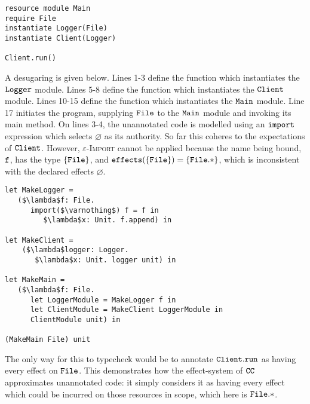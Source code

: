 \begin{lstlisting}
resource module Main
require File
instantiate Logger(File)
instantiate Client(Logger)

Client.run()
\end{lstlisting}

A desugaring is given below. Lines 1-3 define the function which instantiates the $\mathtt{Logger}$ module. Lines 5-8 define the function which instantiates the $\mathtt{Client}$ module. Lines 10-15 define the function which instantiates the $\mathtt{Main}$ module. Line 17 initiates the program, supplying $\mathtt{File}$ to the $\mathtt{Main}$ module and invoking its main method. On lines 3-4, the unannotated code is modelled using an $\mathtt{import}$ expression which selects $\varnothing$ as its authority. So far this coheres to the expectations of $\mathtt{Client}$. However, \textsc{$\varepsilon$-Import} cannot be applied because the name being bound, $\mathtt{f}$, has the type $\{ \mathtt{File} \}$, and $\mathtt{effects}(\{ \mathtt{File} \}) = \{ \mathtt{File}.* \}$, which is inconsistent with the declared effects $\varnothing$.

\begin{lstlisting}
let MakeLogger =
   ($\lambda$f: File.
      import($\varnothing$) f = f in
         $\lambda$x: Unit. f.append) in

let MakeClient =
	($\lambda$logger: Logger.
	   $\lambda$x: Unit. logger unit) in

let MakeMain =
   ($\lambda$f: File.
      let LoggerModule = MakeLogger f in
      let ClientModule = MakeClient LoggerModule in
      ClientModule unit) in

(MakeMain File) unit
\end{lstlisting}

The only way for this to typecheck would be to annotate $\mathtt{Client.run}$ as having every effect on $\mathtt{File}$. This demonstrates how the effect-system of $\mathtt{CC}$ approximates unannotated code: it simply considers it as having every effect which could be incurred on those resources in scope, which here is $\mathtt{File}.*$.



































